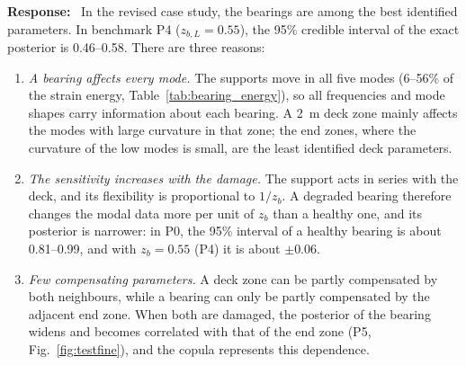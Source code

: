 \documentclass[11pt]{article}
\newenvironment{response}{\par\smallskip\noindent\color{resp}\textbf{Response:}\ }{\par}
\begin{document}
\begin{response}
In the revised case study, the bearings are among the best identified parameters. In benchmark P4 ($z_{b,L}=0.55$),
the 95\% credible interval of the exact posterior is 0.46--0.58. There are three reasons:
\begin{enumerate}[leftmargin=*]
\item \emph{A bearing affects every mode.} The supports move in all five modes (6--56\% of the strain energy,
Table~\ref{tab:bearing_energy}), so all frequencies and mode shapes carry information about each bearing. A 2~m deck
zone mainly affects the modes with large curvature in that zone; the end zones, where the curvature of the low modes is
small, are the least identified deck parameters.
\item \emph{The sensitivity increases with the damage.} The support acts in series with the deck, and its flexibility is
proportional to $1/z_b$. A degraded bearing therefore changes the modal data more per unit of $z_b$ than a healthy one,
and its posterior is narrower: in P0, the 95\% interval of a healthy bearing is about 0.81--0.99, and with $z_b=0.55$ (P4) it is
about $\pm0.06$.
\item \emph{Few compensating parameters.} A deck zone can be partly compensated by both neighbours, while a bearing can
only be partly compensated by the adjacent end zone. When both are damaged, the posterior of the bearing widens and
becomes correlated with that of the end zone (P5, Fig.~\ref{fig:testfine}), and the copula represents this dependence.
\end{enumerate}


\end{response}
\end{document}
